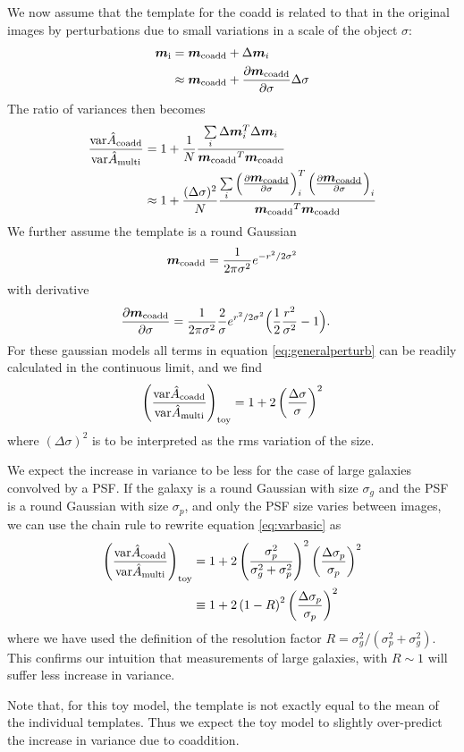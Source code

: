 \documentclass[fleqn,useAMS,usenatbib]{mnras}
\newcommand{\coadd}{{\rm coadd}}
\newcommand{\model}{\mbox{$\boldsymbol{m}$}}
\newcommand{\modelc}{\mbox{$\boldsymbol{m}_\coadd$}}
\begin{document}
We now assume that the template for the coadd is related to that
in the original images by perturbations due to small variations
in a scale of the object $\sigma$:
\begin{align}
    \boldsymbol{m}_{\rm i} &= \boldsymbol{m}_\coadd + \Delta \boldsymbol{m}_i \\
                           &\approx \boldsymbol{m}_\coadd + \frac{\partial \boldsymbol{m}_\coadd}{\partial \sigma} \Delta \sigma
\end{align}
The ratio of variances then becomes
\begin{align} \label{eq:generalperturb}
    \frac{ {\rm var} \hat{A}_\coadd }{{\rm var} \hat{A}_{\rm multi} } &=  
    1 + \frac{1}{N}\frac{\sum\limits_i \Delta \model_i^T \Delta \model_i }{\modelc^T \modelc} \\
    & \approx 
    1 + \frac{(\Delta \sigma)^2}{N}\frac{\sum\limits_i \left( \frac{\partial \modelc}{\partial \sigma} \right)_i^T \left( \frac{\partial \modelc}{\partial \sigma} \right)_i }{\modelc^T \modelc}
\end{align}
We further assume the template is a round Gaussian
\begin{align}
    \modelc = \frac{1}{2 \pi \sigma^2} e^{-r^2/2 \sigma^2 }
\end{align}
with derivative
\begin{align}
    \frac{\partial \modelc}{\partial \sigma} &= \frac{1}{2 \pi \sigma^2} \frac{2}{\sigma} e^{r^2/2 \sigma^2} \Bigl( \frac{1}{2}\frac{r^2}{\sigma^2} - 1 \Bigr).
\end{align}
For these gaussian models all terms in equation \ref{eq:generalperturb} can
be readily calculated in the continuous limit, and we find
\begin{align} \label{eq:varbasic}
    \left( \frac{ {\rm var} \hat{A}_\coadd }{{\rm var} \hat{A}_{\rm multi} } \right)_{\rm toy} = 
    1 + 2 \left( \frac{\Delta \sigma}{\sigma} \right)^2
\end{align}
where $(\Delta \sigma)^2$ is to be interpreted as the rms variation
of the size.

We expect the increase in variance to be less for the case
of large galaxies convolved by a PSF.  If the galaxy is a round Gaussian with
size $\sigma_g$ and the PSF is a round Gaussian with size $\sigma_p$,
and only the PSF size varies between images,
we can use the chain rule to rewrite equation \ref{eq:varbasic} as
\begin{align} \label{eq:vargal_appendix}
    \left( \frac{ {\rm var} \hat{A}_\coadd }{{\rm var} \hat{A}_{\rm multi} } \right)_{\rm toy} &= 
    1 + 2 \left( \frac{\sigma_p^2}{\sigma_g^2 + \sigma_p^2}\right)^2 \left( \frac{\Delta \sigma_p}{\sigma_p} \right)^2 \\
    &\equiv 1 + 2 \left( 1 - R \right)^2 \left( \frac{\Delta \sigma_p}{\sigma_p} \right)^2
\end{align}
where we have used the definition of the resolution factor $R =
\sigma_g^2/(\sigma_p^2 + \sigma_g^2)$.  This confirms our
intuition that measurements of large galaxies, with $R \sim 1$ will suffer
less increase in variance.

Note that, for this toy model, the template is not exactly equal to the mean of
the individual templates.  Thus we expect the toy model to slightly
over-predict the increase in variance due to coaddition.
\end{document}
